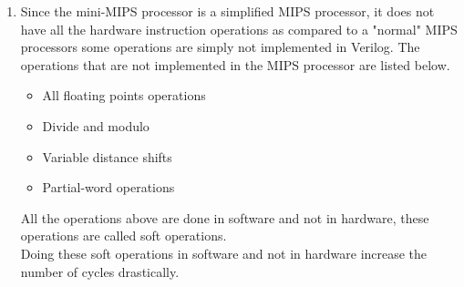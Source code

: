 \documentclass[10pt]{article}
\begin{document}
\begin{enumerate}
\item Since the mini-MIPS processor is a simplified MIPS processor, it does not have all the hardware instruction operations as compared to a "normal" MIPS processors some operations are simply not implemented in Verilog.
The operations that are not implemented in the MIPS processor are listed below.

\begin{itemize}
    \item All floating points operations
    \item Divide and modulo
    \item Variable distance shifts
    \item Partial-word operations
 \end{itemize}
 All the operations above are done in software and not in hardware, these operations are called soft operations.\\
 Doing these soft operations in software and not in hardware increase the number of cycles drastically.\\
 

\end{enumerate}
\end{document}
